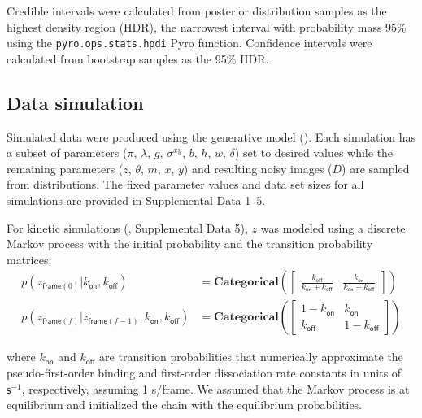 Credible intervals were calculated from posterior distribution samples as the highest density region (HDR), the narrowest interval with probability mass 95\% using the \texttt{pyro.ops.stats.hpdi} Pyro function. Confidence intervals were calculated from bootstrap samples as the 95\% HDR.

\subsection{Data simulation}

Simulated data were produced using the generative model (). Each simulation has a subset of parameters ($\pi$, $\lambda$, $g$, $\sigma^{xy}$, $b$, $h$, $w$, $\delta$) set to desired values while  the remaining parameters ($z$, $\theta$, $m$, $x$, $y$) and resulting noisy images ($D$) are sampled from distributions. The fixed parameter values and data set sizes for all simulations are provided in Supplemental Data 1--5.

For kinetic simulations (, Supplemental Data 5), $z$ was modeled using a discrete Markov process with the initial probability and the transition probability matrices:
\begin{subequations}
\begin{align}
    p(z_{\mathsf{frame}(0)} | k_\mathsf{on}, k_\mathsf{off}) &= \mathbf{Categorical} \left( \begin{bmatrix} \frac{k_\mathsf{off}}{k_\mathsf{on} + k_\mathsf{off}} & \frac{k_\mathsf{on}}{k_\mathsf{on} + k_\mathsf{off}} \end{bmatrix} \right) \\
    p(z_{\mathsf{frame}(f)} | z_{\mathsf{frame}(f-1)}, k_\mathsf{on}, k_\mathsf{off}) &= \mathbf{Categorical} \left( \begin{bmatrix} 1 - k_\mathsf{on} & k_\mathsf{on} \\ k_\mathsf{off} & 1 - k_\mathsf{off} \end{bmatrix} \right)
\end{align}
\end{subequations}

\noindent
where $k_{\mathsf{on}}$ and $k_{\mathsf{off}}$ are transition probabilities that numerically approximate the pseudo-first-order binding and first-order dissociation rate constants in units of $\mathsf{s}^{-1}$, respectively, assuming 1 s/frame. We assumed that the Markov process is at equilibrium and initialized the chain with the equilibrium probabilities.

